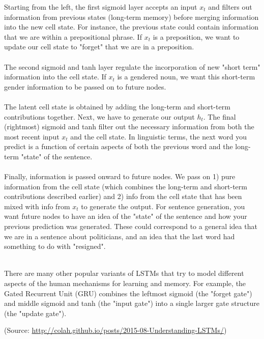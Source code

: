\documentclass{article}
\begin{document}
Starting from the left, the first sigmoid layer accepts an input $x_t$ and filters out information from previous states (long-term memory) before merging information into the new cell state. For instance, the previous state could contain information that we are within a prepositional phrase. If $x_t$ is a preposition, we want to update our cell state to "forget" that we are in a preposition.\\ \\ \noindent
The second sigmoid and tanh layer regulate the incorporation of new "short term" information into the cell state. If $x_t$ is a gendered noun, we want this short-term gender information to be passed on to future nodes.\\ \\ \noindent
The latent cell state is obtained by adding the long-term and short-term contributions together. Next, we have to generate our output $h_t$. The final (rightmost) sigmoid and tanh filter out the necessary information from both the most recent input $x_t$ and the cell state. In linguistic terms, the next word you predict is a function of certain aspects of both the previous word and the long-term "state" of the sentence.\\ \\ \noindent
Finally, information is passed onward to future nodes. We pass on 1) pure information from the cell state (which combines the long-term and short-term contributions described earlier) and 2) info from the cell state that has been mixed with info from $x_t$ to generate the output. For sentence generation, you want future nodes to have an idea of the "state" of the sentence and how your previous prediction was generated. These could correspond to a general idea that we are in a sentence about politicians, and an idea that the last word had something to do with "resigned". \\ \\ \noindent

There are many other popular variants of LSTMs that try to model different aspects of the human mechanisms for learning and memory. For example, the Gated Recurrent Unit (GRU) combines the leftmost sigmoid (the "forget gate") and middle sigmoid and tanh (the "input gate") into a single larger gate structure (the "update gate"). 


(Source: \url{http://colah.github.io/posts/2015-08-Understanding-LSTMs/})
\end{document}
